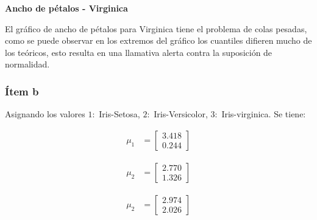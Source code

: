 \textbf{Ancho de pétalos - Virginica}

El gráfico de ancho de pétalos para Virginica tiene el problema de colas pesadas, como se puede observar en los extremos del gráfico los cuantiles difieren mucho de los teóricos, esto resulta en una llamativa alerta contra la suposición de normalidad.


\subsubsection*{Ítem b}
Asignando los valores $1:$ Iris-Setosa, $2:$ Iris-Versicolor, $3:$ Iris-virginica. Se tiene:

\begin{minipage}{\linewidth}
  \centering
  \begin{minipage}{0.25\linewidth}
        \begin{align*}
            \mu_1 &= \begin{bmatrix}
            3.418 \\
            0.244
            \end{bmatrix}
        \end{align*}
  \end{minipage}
  \hspace{0.05\linewidth}
  \begin{minipage}{0.25\linewidth}
        \begin{align*}
            \mu_2 &= \begin{bmatrix}
            2.770 \\
            1.326
            \end{bmatrix}
        \end{align*}
  \end{minipage}
  \hspace{0.05\linewidth}
  \begin{minipage}{0.25\linewidth}
        \begin{align*}
            \mu_2 &= \begin{bmatrix}
            2.974 \\
            2.026
            \end{bmatrix}
        \end{align*}
  \end{minipage}
\end{minipage}

\vskip0.5cm

